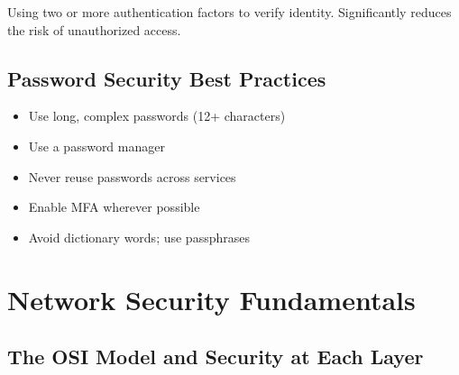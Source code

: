 \documentclass[11pt,a4paper]{article}
\begin{document}
\begin{definitionbox}
Using two or more authentication factors to verify identity. Significantly reduces the risk of unauthorized access.
\end{definitionbox}

\subsection{Password Security Best Practices}
\begin{itemize}[leftmargin=*]
  \item Use long, complex passwords (12+ characters)
  \item Use a password manager
  \item Never reuse passwords across services
  \item Enable MFA wherever possible
  \item Avoid dictionary words; use passphrases
\end{itemize}

\section{Network Security Fundamentals}

\subsection{The OSI Model and Security at Each Layer}
\end{document}
